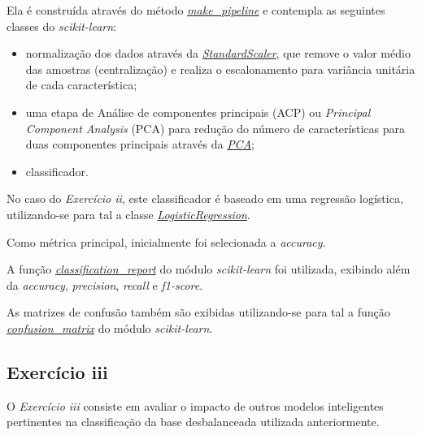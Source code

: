 Ela é construída através do método \href{https://scikit-learn.org/stable/modules/generated/sklearn.pipeline.make_pipeline.html}{\textit{make\_pipeline}} e  contempla as seguintes classes do \textit{scikit-learn}:
\begin{itemize}
    \item normalização dos dados através da \href{https://scikit-learn.org/stable/modules/generated/sklearn.preprocessing.StandardScaler.html}{\textit{StandardScaler}}, que remove o valor médio das amostras (centralização) e realiza o escalonamento para variância unitária de cada característica;
    \item uma etapa de Análise de componentes principais (ACP) ou \textit{Principal Component Analysis} (PCA) para redução do número de características para duas componentes principais através da \href{https://scikit-learn.org/stable/modules/generated/sklearn.decomposition.PCA.html}{\textit{PCA}};
    \item classificador.
\end{itemize}

No caso do \textit{Exercício ii}, este classificador é baseado em uma regressão logística, utilizando-se para tal a classe \href{https://scikit-learn.org/stable/modules/generated/sklearn.linear_model.LogisticRegression.html}{\textit{LogisticRegression}}.

Como métrica principal, inicialmente foi selecionada a \textit{accuracy}.

A função \href{https://scikit-learn.org/stable/modules/generated/sklearn.metrics.classification_report.html}{\textit{classification\_report}} do módulo \textit{scikit-learn} foi utilizada, exibindo além da \textit{accuracy}, \textit{precision}, \textit{recall} e \textit{f1-score}.

As matrizes de confusão também são exibidas utilizando-se para tal a função \href{https://scikit-learn.org/stable/modules/generated/sklearn.metrics.confusion_matrix.html}{\textit{confusion\_matrix}} do módulo \textit{scikit-learn}.

\subsection{Exercício iii}

O \textit{Exercício iii} consiste em avaliar o impacto de outros modelos inteligentes pertinentes na classificação da base desbalanceada utilizada anteriormente.


